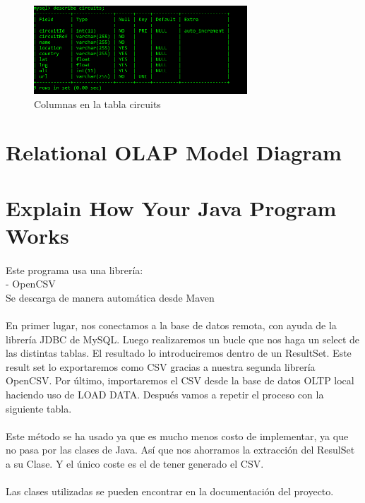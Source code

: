 \documentclass[a4paper 
,twoside
]{article}
\begin{document}
  \begin{figure}[H]
    \centering
    \label{table_columns}
    \includegraphics[width=8cm]{table_columns.png}
    \caption{Columnas en la tabla circuits}
  \end{figure}

\pagebreak
\section{Relational OLAP Model Diagram}

\pagebreak
\section{Explain How Your Java Program Works}
  \paragraph{}
  Este programa usa una librería:\\
  -	OpenCSV\\
  Se descarga de manera automática desde Maven 
  \paragraph{}
  En primer lugar, nos conectamos a la base de datos remota, con ayuda de la librería JDBC de MySQL. Luego realizaremos un bucle que nos haga un select de las distintas tablas. El resultado lo introduciremos dentro de un ResultSet. Este result set lo exportaremos como CSV gracias a nuestra segunda librería OpenCSV. Por último, importaremos el CSV desde la base de datos OLTP local haciendo uso de LOAD DATA. Después vamos a repetir el proceso con la siguiente tabla.
  \paragraph{}
  Este método se ha usado ya que es mucho menos costo de implementar, ya que no pasa por las clases de Java. Así que nos ahorramos la extracción del ResulSet a su Clase. Y el único coste es el de tener generado el CSV.

  \paragraph{}
  Las clases utilizadas se pueden encontrar en la documentación del proyecto.
  \pagebreak
\end{document}
